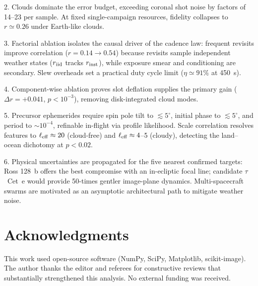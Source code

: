 \documentclass[twocolumn,10pt]{article}
\newcommand{\acknowledgments}{\section*{Acknowledgments}}
\begin{document}
2. Clouds dominate the error budget, exceeding coronal shot noise by factors
of 14--23 per sample. At fixed single-campaign resources, fidelity collapses to
$r\simeq0.26$ under Earth-like clouds.

3. Factorial ablation isolates the causal driver of the cadence law: frequent
revisits improve correlation ($r=0.14\to0.54$) because revisits sample
independent weather states ($r_{\rm iid}$ tracks $r_{\rm inst}$), while
exposure smear and conditioning are secondary. Slew overheads set a practical
duty cycle limit ($\eta\simeq91\%$ at 450~s).

4. Component-wise ablation proves slot deflation supplies the primary gain
($\Delta r=+0.041$, $p<10^{-3}$), removing disk-integrated cloud modes.

5. Precursor ephemerides require spin pole tilt to $\lesssim5^\circ$, initial
phase to $\lesssim5^\circ$, and period to $\sim10^{-4}$, refinable in-flight
via profile likelihood. Scale correlation resolves features to $\ell_{\rm eff}\approx20$
(cloud-free) and $\ell_{\rm eff}\approx4$--5 (cloudy), detecting the land--ocean
dichotomy at $p<0.02$.

6. Physical uncertainties are propagated for the five nearest confirmed targets:
Ross 128~b offers the best compromise with an in-ecliptic focal line; candidate
$\tau$~Cet~e would provide 50-times gentler image-plane dynamics. Multi-spacecraft
swarms are motivated as an asymptotic architectural path to mitigate weather noise.

\acknowledgments
This work used open-source software (NumPy, SciPy, Matplotlib, scikit-image).
The author thanks the editor and referees for constructive reviews that
substantially strengthened this analysis. No external funding was received.
\end{document}
